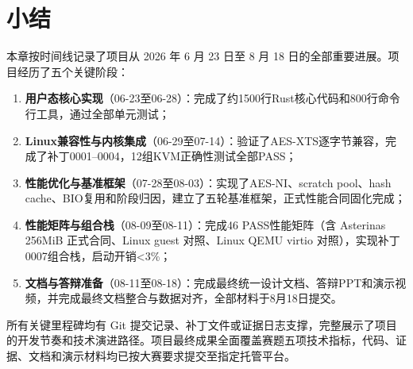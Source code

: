 \section{小结}

本章按时间线记录了项目从 2026 年 6 月 23 日至 8 月 18 日的全部重要进展。项目经历了五个关键阶段：

\begin{enumerate}
    \item \textbf{用户态核心实现}（06-23至06-28）：完成了约1500行Rust核心代码和800行命令行工具，通过全部单元测试；
    \item \textbf{Linux兼容性与内核集成}（06-29至07-14）：验证了AES-XTS逐字节兼容，完成了补丁0001--0004，12组KVM正确性测试全部PASS；
    \item \textbf{性能优化与基准框架}（07-28至08-03）：实现了AES-NI、scratch pool、hash cache、BIO复用和阶段归因，建立了五轮基准框架，正式性能合同固化完成；
    \item \textbf{性能矩阵与组合栈}（08-09至08-11）：完成46 PASS性能矩阵（含 Asterinas 256MiB 正式合同、Linux guest 对照、Linux QEMU virtio 对照），实现补丁0007组合栈，启动开销<3\%；
    \item \textbf{文档与答辩准备}（08-11至08-18）：完成最终统一设计文档、答辩PPT和演示视频，并完成最终文档整合与数据对齐，全部材料于8月18日提交。
\end{enumerate}

所有关键里程碑均有 Git 提交记录、补丁文件或证据日志支撑，完整展示了项目的开发节奏和技术演进路径。项目最终成果全面覆盖赛题五项技术指标，代码、证据、文档和演示材料均已按大赛要求提交至指定托管平台。